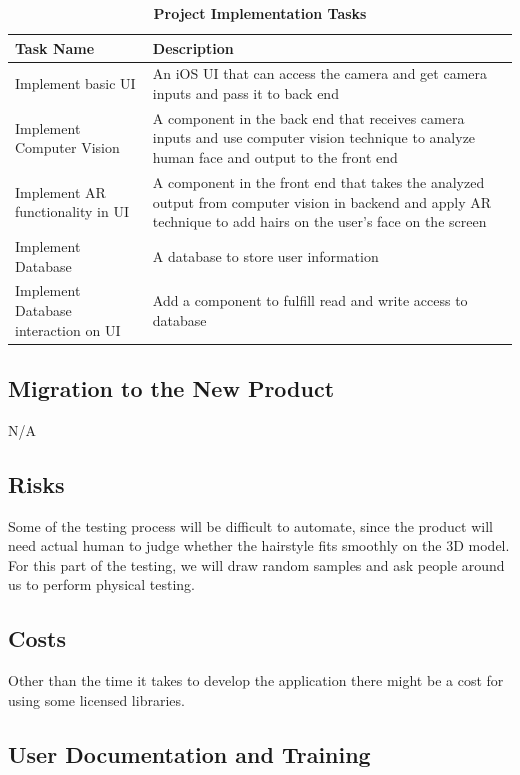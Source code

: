 \documentclass[12pt]{article}
\begin{document}
\begin{flushleft}
\begin{table}[bp hp]
\caption{\bf Project Implementation Tasks}
    \begin{tabularx}{\linewidth}{|l|X|}
        \toprule {\bf Task Name} & {\bf Description}\\
        \midrule
        Implement basic UI & An iOS UI that can access the camera and get camera inputs and pass it to back end\\
        \hline
        Implement Computer Vision & A component in the back end that receives camera inputs and use computer vision technique to analyze human face and output to the front end\\
        \hline
        Implement AR functionality in UI & A component in the front end that takes the analyzed output from computer vision in backend and apply AR technique to add hairs on the user's face on the screen\\
        \hline
        Implement Database & A database to store user information\\
        \hline
        Implement Database interaction on UI & Add a component to fulfill read and write access to database\\
        \bottomrule
    \end{tabularx}
\end{table}
\end{flushleft}
\subsection{Migration to the New Product}
N/A

\subsection{Risks}
Some of the testing process will be difficult to automate, since the product will need actual human to judge whether the hairstyle fits smoothly on the 3D model. For this part of the testing, we will draw random samples and ask people around us to perform physical testing.

\subsection{Costs}

Other than the time it takes to develop the application there might be a cost for using some licensed libraries. 

\subsection{User Documentation and Training}
\end{document}
